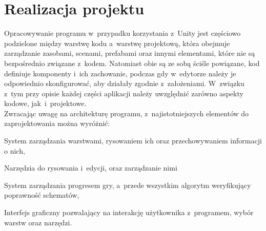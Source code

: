 \chapter{Realizacja projektu}
\label{ch:realizacja_projektu}

Opracowywanie programu w~przypadku korzystania z~Unity jest częściowo podzielone między warstwę kodu a~warstwę projektową,
która obejmuje zarządzanie zasobami, scenami, prefabami oraz innymi elementami, które nie są bezpośrednio związane z~kodem.
Natomiast obie są ze sobą ściśle powiązane, kod definiuje komponenty i~ich zachowanie,
podczas gdy w~edytorze należy je odpowiednio skonfigurować, aby działały zgodnie z~założeniami.
W~związku z~tym przy opisie każdej części aplikacji należy uwzględnić zarówno aspekty kodowe, jak~i~projektowe.\\
\indent Zwracając uwagę na architekturę programu, z~najistotniejszych elementów do zaprojektowania można wyróżnić:

\begin{citemize}
    \item System zarządzania warstwami, rysowaniem ich oraz przechowywaniem informacji o nich,
    \item Narzędzia do rysowania i~edycji, oraz zarządzanie nimi
    \item System zarządzania progresem gry, a~przede wszystkim algorytm weryfikujący poprawność schematów,
    \item Interfejs graficzny pozwalający na interakcję użytkownika z~programem, wybór warstw oraz narzędzi.
\end{citemize}




